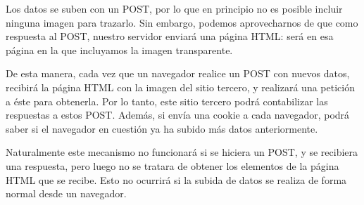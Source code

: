 Los datos se suben con un POST, por lo que en principio no es posible incluir ninguna imagen para trazarlo. Sin embargo, podemos aprovecharnos de que como respuesta al POST, nuestro servidor enviará una página HTML: será en esa página en la que incluyamos la imagen transparente.

De esta manera, cada vez que un navegador realice un POST con nuevos datos, recibirá la página HTML con la imagen del sitio tercero, y realizará una petición a éste para obtenerla. Por lo tanto, este sitio tercero podrá contabilizar las respuestas a estos POST. Además, si envía una cookie a cada navegador, podrá saber si el navegador en cuestión ya ha subido más datos anteriormente.

Naturalmente este mecanismo no funcionará si se hiciera un POST, y se recibiera una respuesta, pero luego no se tratara de obtener los elementos de la página HTML que se recibe. Esto no ocurrirá si la subida de datos se realiza de forma normal desde un navegador.
